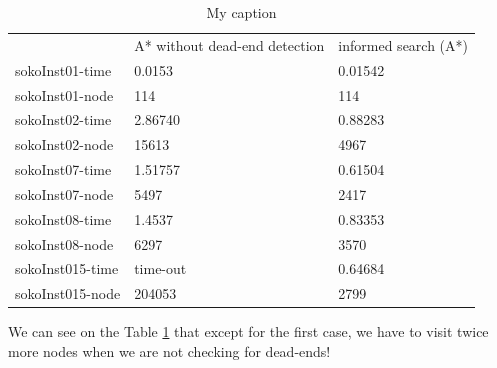 \documentclass[10pt]{report}
\begin{document}
\begin{table}[h!]
\centering
\caption{My caption}
\label{dead-end}
\begin{tabular}{lll}
                 & A* without dead-end detection & informed search (A*) \\
sokoInst01-time  & 0.0153                        & 0.01542              \\
sokoInst01-node  & 114                           & 114                  \\
sokoInst02-time  & 2.86740                       & 0.88283              \\
sokoInst02-node  & 15613                         & 4967                 \\
sokoInst07-time  & 1.51757                       & 0.61504              \\
sokoInst07-node  & 5497                          & 2417                 \\
sokoInst08-time  & 1.4537                        & 0.83353              \\
sokoInst08-node  & 6297                          & 3570                 \\
sokoInst015-time &  time-out                             & 0.64684              \\
sokoInst015-node & 204053                        & 2799                
\end{tabular}
\end{table}

We can see on the Table \ref{dead-end} that except for the first case, we have to visit twice more nodes when we are not checking for dead-ends!
\end{document}
